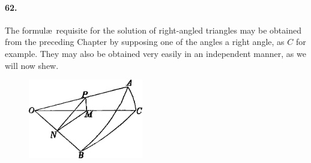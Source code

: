 \documentclass{book}[2004/02/16]
\begin{document}
\begin{mainmatter}
\begin{spacing}{1.3}
\paragraph{62.} The formul\ae\ requisite for the solution of right-angled
triangles may be obtained from the preceding Chapter by supposing
one of the angles a right angle, as $C$ for example. They
may also be obtained very easily in an independent manner, as
we will now shew.
\begin{figure}[htp]
\centering
\includegraphics[width=5.0cm]{images/043fc}
\end{figure}


\end{spacing}
\end{mainmatter}
\end{document}
